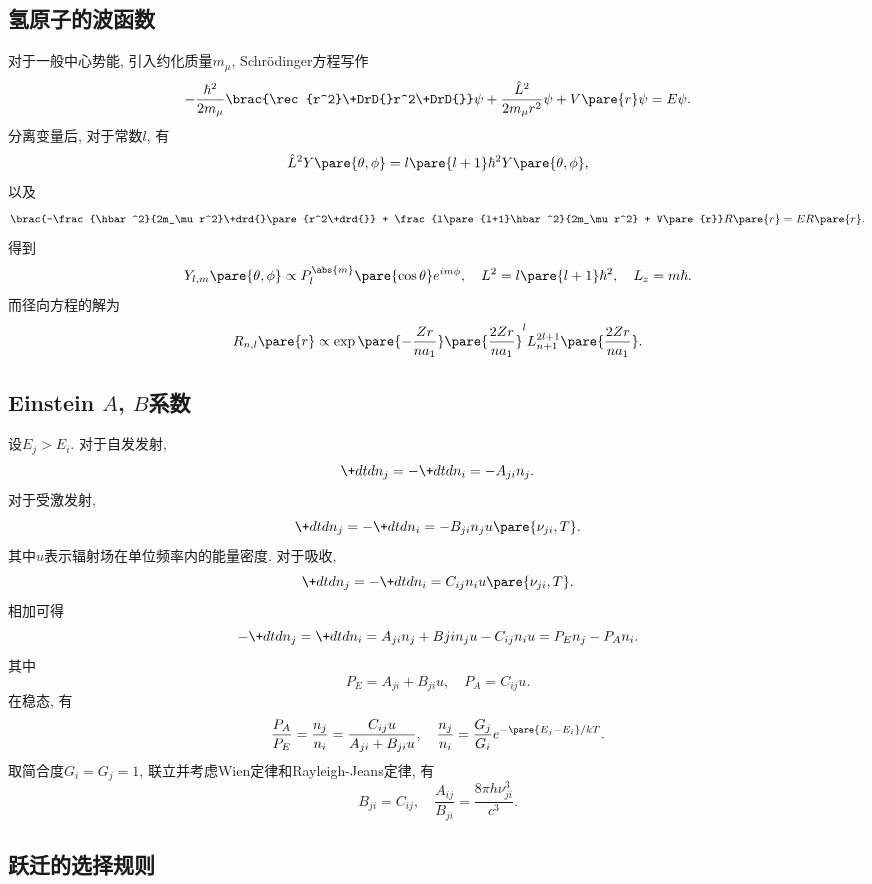\documentclass[hidelinks]{ctexart}
\begin{document}

\subsection{氢原子的波函数} %
\label{sub:氢原子的波函数}

对于一般中心势能, 引入约化质量$m_\mu$, Schr\"odinger方程写作
\[ -\frac{\hbar^2}{2m_\mu}\brac{\rec{r^2}\+DrD{}r^2\+DrD{}}\psi + \frac{\hat L^2}{2m_\mu r^2}\psi + V\pare{r}\psi = E\psi. \]
分离变量后, 对于常数$l$, 有
\[ \hat L^2 Y\pare{\theta,\phi} = l\pare{l+1}\hbar^2 Y\pare{\theta,\phi}, \]
以及
\[ \brac{-\frac{\hbar^2}{2m_\mu r^2}\+drd{}\pare{r^2\+drd{}} + \frac{l\pare{l+1}\hbar^2}{2m_\mu r^2} + V\pare{r}}R\pare{r} = ER\pare{r}. \]
得到
\[ Y_{l,m}\pare{\theta,\phi} \propto P_l^{\abs{m}}\pare{\cos\theta}e^{im\phi},\quad L^2 = l\pare{l+1}\hbar^2,\quad L_z = m\hbar. \]
而径向方程的解为
\[ R_{n,l}\pare{r} \propto \exp\pare{-\frac{Zr}{na_1}}\pare{\frac{2Zr}{na_1}}^lL^{2l+1}_{n+1}\pare{\frac{2Zr}{na_1}}. \]


\subsection{Einstein \texorpdfstring{$A$}{A}, \texorpdfstring{$B$}{B}系数} %
\label{sub:einsteintexorpdfstring_a_b系数}

设$E_j > E_i$. 对于自发发射,
\[ \+dtd{n_j} = -\+dtd{n_i} = -A_{ji}n_j. \]
对于受激发射,
\[ \+dtd{n_j} = -\+dtd{n_i} = -B_{ji}n_ju\pare{\nu_{ji},T}. \]
其中$u$表示辐射场在单位频率内的能量密度. 对于吸收,
\[ \+dtd{n_j} = -\+dtd{n_i} = C_{ij}n_iu\pare{\nu_{ji},T}. \]
相加可得
\[ -\+dtd{n_j} = \+dtd{n_i} = A_{ji}n_j + B{ji}n_j u - C_{ij}n_iu = P_E n_j - P_A n_i. \]
其中
\[ P_E = A_{ji} + B_{ji}u,\quad P_A = C_{ij} u. \]
在稳态, 有
\[ \frac{P_A}{P_E} = \frac{n_j}{n_i} = \frac{C_{ij}u}{A_{ji} + B_{ji}u},\quad \frac{n_j}{n_i} = \frac{G_j}{G_i}e^{-\pare{E_j - E_i}/kT}. \]
取简合度$G_i=G_j=1$, 联立并考虑Wien定律和Rayleigh-Jeans定律, 有
\[ B_{ji} = C_{ij},\quad \frac{A_{ij}}{B_{ji}} = \frac{8\pi h\nu_{ji}^3}{c^3}. \]


\subsection{跃迁的选择规则} %
\label{sub:跃迁的选择规则}
\end{document}

